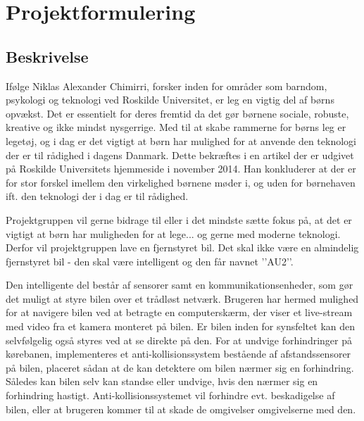 \chapter{Projektformulering} \label{ch:projektformulering}


\section{Beskrivelse} \label{sec:beskrivelse}
Ifølge Niklas Alexander Chimirri, forsker inden for områder som barndom, psykologi og teknologi ved Roskilde Universitet, er leg en vigtig del af børns opvækst.   
Det er essentielt for deres fremtid da det gør børnene sociale, robuste, kreative og ikke mindst nysgerrige. Med til at skabe rammerne for børns leg er legetøj, og i dag er det vigtigt at børn har mulighed for at anvende den teknologi der er til rådighed i dagens Danmark. 
Dette bekræftes i en artikel der er udgivet på Roskilde Universitets hjemmeside i november 2014.
Han konkluderer at der er for stor forskel imellem den virkelighed børnene møder i, og uden for børnehaven ift. den teknologi der i dag er til rådighed. 

Projektgruppen vil gerne bidrage til eller i det mindste sætte fokus på, at det er vigtigt at børn har muligheden for at lege... og gerne med moderne teknologi. Derfor vil projektgruppen lave en fjernstyret bil. Det skal ikke være en almindelig fjernstyret bil - den skal være intelligent og den får navnet ’’AU2’’.

Den intelligente del består af sensorer samt en kommunikationsenheder, som gør det muligt at styre bilen over et trådløst netværk. Brugeren har hermed mulighed for at navigere bilen ved at betragte en computerskærm, der viser et live-stream med video fra et kamera monteret på bilen. Er bilen inden for synsfeltet kan den selvfølgelig også styres ved at se direkte på den. For at undvige forhindringer på kørebanen, implementeres et anti-kollisionssystem bestående af afstandssensorer på bilen, placeret sådan at de kan detektere om bilen nærmer sig en forhindring. Således kan bilen selv kan standse eller undvige, hvis den nærmer sig en forhindring hastigt. Anti-kollisionssystemet vil forhindre evt. beskadigelse af bilen, eller at brugeren kommer til at skade de omgivelser omgivelserne med den.
\clearpage

